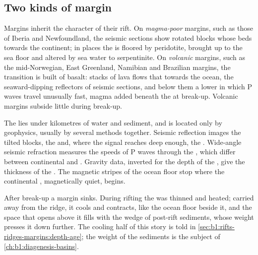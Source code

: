 \subsection*{Two kinds of margin}

Margins inherit the character of their rift. On \emph{magma-poor} margins,
such as those of Iberia and Newfoundland, the seismic sections show rotated
blocks whose beds  towards the continent; in places the  is floored by  peridotite, brought up to the sea floor and
altered by sea water to serpentinite. On \emph{volcanic} margins, such as the
mid-Norwegian, East Greenland, Namibian and Brazilian margins, the transition
is built of basalt: stacks of lava flows that  towards the ocean, the
seaward-dipping reflectors of seismic sections, and below them a lower 
in which P waves travel unusually fast, magma added beneath the  at
break-up. Volcanic margins subside little during break-up.

\begin{inthefield}
The  lies under kilometres of water and sediment,
and is located only by geophysics, usually by several methods together.
Seismic reflection images the tilted blocks, the  and,
where the signal reaches deep enough, the . Wide-angle seismic refraction
measures the speeds of P waves through the , which differ between
continental and . Gravity data, inverted for the depth of the
, give the thickness of the . The magnetic stripes of the ocean floor
stop where the continental , magnetically quiet, begins.
\end{inthefield}

After break-up a margin sinks. During rifting the  was thinned and
heated; carried away from the ridge, it cools and contracts, like the ocean
floor beside it, and the space that opens above it fills with the wedge of
post-rift sediments, whose weight presses it down further. The cooling half of
this story is told in \cref{sec:b1:rifts-ridges-margins:depth-age}; the
weight of the sediments is the subject of \cref{ch:b1:diagenesis-basins}.

